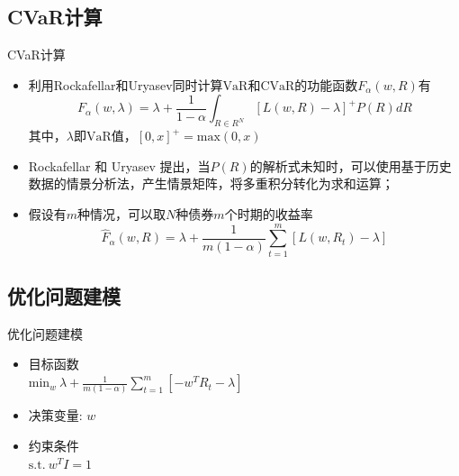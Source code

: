 \documentclass[CJK,aspectratio=43]{beamer}  %
\begin{document}
\subsection{CVaR计算}
\begin{frame}{CVaR计算}
	\begin{itemize}
		\item 利用Rockafellar和Uryasev同时计算$\text{VaR}$和$\text{CVaR}$的功能函数$F_{\alpha}(w,R)$有
		$$
		F_{\alpha}(w,\lambda)=\lambda+\frac{1}{1-\alpha}\int_{R\in R^N}[L(w,R)-\lambda]^{+}P(R)dR
		$$
		其中，$\lambda$即$\text{VaR}$值，$[0,x]^+=\text{max}(0,x)$
		\item Rockafellar 和 Uryasev 提出，当$P(R)$的解析式未知时，可以使用基于历史数据的情景分析法，产生情景矩阵，将多重积分转化为求和运算；
		\item 假设有$m$种情况，可以取$N$种债券$m$个时期的收益率
		$$
		\widehat{F}_{\alpha}(w,R)=\lambda+\frac{1}{m(1-\alpha)}\sum_{t=1}^{m}[L(w,R_t)-\lambda]
		$$
	\end{itemize}
\end{frame}

\subsection{优化问题建模}
\begin{frame}{优化问题建模}
	\begin{itemize}
		\item 目标函数 \\
		$
		\text{min}_{w} \ \lambda+\frac{1}{m(1-\alpha)}\sum_{t=1}^{m}[-w^TR_t-\lambda]
		$
		\item 决策变量: $w$
		\item 约束条件 \\
		$
		\text{s.t.} \ w^TI=1
		$
	\end{itemize}
\end{frame}
\end{document}
